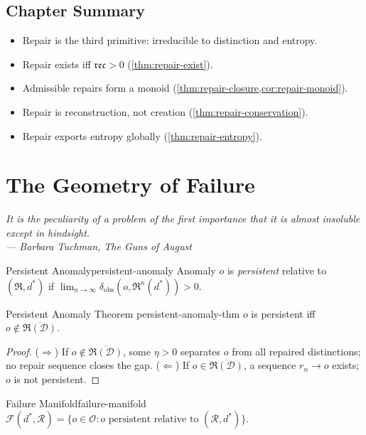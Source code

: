 \documentclass[12pt,twoside,openright]{book}
\newcommand{\repair}{\mathfrak{R}}
\newcommand{\reco}{\mathfrak{rec}}
\newenvironment{epigraph}[2]{%
  \vspace{1em}\begin{flushright}
  \begin{minipage}{0.72\textwidth}
  \itshape\small #1\\[0.4em]
  \upshape\footnotesize\sffamily\color{DistGray}--- #2
  \end{minipage}\end{flushright}\vspace{1.5em}}{}
\newenvironment{chapsummary}{%
  \begin{tcolorbox}[colback=DistBlue!5,colframe=DistBlue,
    title={\faBookOpen\enspace Summary},
    fonttitle=\sffamily\bfseries\color{white},
    attach boxed title to top left={yshift=-2mm,xshift=4mm},
    boxed title style={colback=DistBlue,rounded corners}]
  \begin{itemize}[nosep,leftmargin=*]}{%
  \end{itemize}\end{tcolorbox}}
\begin{document}
\section*{Chapter Summary}
\begin{chapsummary}
  \item Repair is the third primitive: irreducible to
        distinction and entropy.
  \item Repair exists iff $\reco>0$
        (\cref{thm:repair-exist}).
  \item Admissible repairs form a monoid
        (\cref{thm:repair-closure,cor:repair-monoid}).
  \item Repair is reconstruction, not creation
        (\cref{thm:repair-conservation}).
  \item Repair exports entropy globally
        (\cref{thm:repair-entropy}).
\end{chapsummary}

\chapter{The Geometry of Failure}
\label{ch:geometry-failure}
\begin{epigraph}{It is the peculiarity of a problem of the
  first importance that it is almost insoluble except in
  hindsight.}%
  {Barbara Tuchman, \textit{The Guns of August}}
\end{epigraph}

\begin{definition}{Persistent Anomaly}{persistent-anomaly}
  Anomaly $o$ is \emph{persistent} relative to
  $(\repair,d^*)$ if
  $\lim_{n\to\infty}\delta_\mathrm{obs}(o,\repair^n(d^*))>0$.
\end{definition}

\begin{theorem}{Persistent Anomaly Theorem}%
  {persistent-anomaly-thm}
  $o$ is persistent iff
  $o\notin\overline{\repair(\mathcal{D})}$.
\end{theorem}
\begin{proof}
  ($\Rightarrow$) If $o\notin\overline{\repair(\mathcal{D})}$,
  some $\eta>0$ separates $o$ from all repaired
  distinctions; no repair sequence closes the gap.
  ($\Leftarrow$) If $o\in\overline{\repair(\mathcal{D})}$,
  a sequence $r_n\to o$ exists; $o$ is not persistent.
\end{proof}

\begin{definition}{Failure Manifold}{failure-manifold}
  $\mathcal{F}(d^*,\mathcal{R})=\{o\in\mathcal{O}:
  o\text{ persistent relative to }(\mathcal{R},d^*)\}$.
\end{definition}
\end{document}
